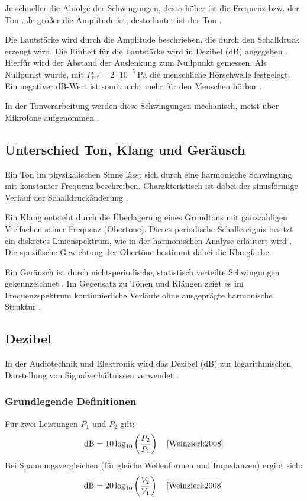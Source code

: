 Je schneller die Abfolge der Schwingungen, desto höher ist die Frequenz bzw. der Ton \cite{Weinzierl:2008}. Je größer die Amplitude ist, desto lauter ist der Ton \cite{Bernstein:2019b}. 

Die Lautstärke wird durch die Amplitude beschrieben, die durch den Schalldruck erzeugt wird. Die Einheit für die Lautstärke wird in Dezibel (dB) angegeben \cite{Weinzierl:2008}. Hierfür wird der Abstand der Auslenkung zum Nullpunkt gemessen. Als Nullpunkt wurde, mit $P_{\text{ref}} = 2 \cdot 10^{-5}\ \text{Pa}$ die menschliche Hörschwelle festgelegt. Ein negativer dB-Wert ist somit nicht mehr für den Menschen hörbar \cite{Weinzierl:2008}\cite{Luders:2017}.

In der Tonverarbeitung werden diese Schwingungen mechanisch, meist über Mikrofone aufgenommen \cite{Weinzierl:2008}.

\subsection{Unterschied Ton, Klang und Geräusch} \label{MP34DT05-TonKlangGeräusch}

Ein Ton im physikalischen Sinne lässt sich durch eine harmonische Schwingung mit konstanter Frequenz beschreiben. Charakteristisch ist dabei der sinusförmige Verlauf der Schalldruckänderung \cite{Weinzierl:2008}\cite{Bernstein:2019b}.

Ein Klang entsteht durch die Überlagerung eines Grundtons mit ganzzahligen Vielfachen seiner Frequenz (Obertöne). Dieses periodische Schallereignis besitzt ein diskretes Linienspektrum, wie in der harmonischen Analyse erläutert wird \cite{Weinzierl:2008}. Die spezifische Gewichtung der Obertöne bestimmt dabei die Klangfarbe.

Ein Geräusch ist durch nicht-periodische, statistisch verteilte Schwingungen gekennzeichnet \cite{Weinzierl:2008}. Im Gegensatz zu Tönen und Klängen zeigt es im Frequenzspektrum kontinuierliche Verläufe ohne ausgeprägte harmonische Struktur \cite{Bernstein:2019b}.

\bigskip

\subsection{Dezibel} \label{MP34DT05-Dezibel}
In der Audiotechnik und Elektronik wird das Dezibel (dB) zur logarithmischen Darstellung von Signalverhältnissen verwendet \cite{Weinzierl:2008}.

\subsubsection*{Grundlegende Definitionen}
Für zwei Leistungen \( P_1 \) und \( P_2 \) gilt:
\[
\text{dB} = 10 \log_{10} \left( \frac{P_2}{P_1} \right) \quad \text{\cite{Weinzierl:2008}}
\]
Bei Spannungsvergleichen (für gleiche Wellenformen und Impedanzen) ergibt sich:
\[
\text{dB} = 20 \log_{10} \left( \frac{V_2}{V_1} \right) \quad \text{\cite{Weinzierl:2008}}
\]

